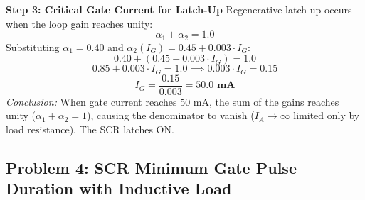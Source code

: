 \documentclass[11pt,a4paper]{article}
\begin{document}
\begin{examplebox}
\textbf{Step 3: Critical Gate Current for Latch-Up}
Regenerative latch-up occurs when the loop gain reaches unity:
\begin{equation}
\alpha_1 + \alpha_2 = 1.0
\end{equation}
Substituting $\alpha_1 = 0.40$ and $\alpha_2(I_G) = 0.45 + 0.003 \cdot I_G$:
\begin{equation}
0.40 + (0.45 + 0.003 \cdot I_G) = 1.0
\end{equation}
\begin{equation}
0.85 + 0.003 \cdot I_G = 1.0 \implies 0.003 \cdot I_G = 0.15
\end{equation}
\begin{equation}
I_G = \frac{0.15}{0.003} = \mathbf{50.0\text{ mA}}
\end{equation}
\textit{Conclusion:} When gate current reaches \textbf{$50\text{ mA}$}, the sum of the gains reaches unity ($\alpha_1 + \alpha_2 = 1$), causing the denominator to vanish ($I_A \to \infty$ limited only by load resistance). The SCR latches ON.
\end{examplebox}

\subsection{Problem 4: SCR Minimum Gate Pulse Duration with Inductive Load}
\end{document}
